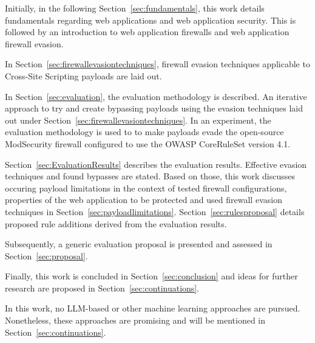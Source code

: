 Initially, in the following Section~\ref{sec:fundamentals}, this work details fundamentals regarding web applications and web application security. This is followed by an introduction to web application firewalls and web application firewall evasion.

In Section~\ref{sec:firewallevasiontechniques}, firewall evasion techniques applicable to Cross-Site Scripting payloads are laid out.

In Section~\ref{sec:evaluation}, the evaluation methodology is described. An iterative approach to try and create bypassing payloads using the evasion techniques laid out under Section~\ref{sec:firewallevasiontechniques}. In an experiment, the evaluation methodology is used to to make payloads evade the open-source ModSecurity firewall configured to use the OWASP CoreRuleSet version 4.1.

Section~\ref{sec:EvaluationResults} describes the evaluation results. Effective evasion techniques and found bypasses are stated. Based on those, this work discusses occuring payload limitations in the context of tested firewall configurations, properties of the web application to be protected and used firewall evasion techniques in Section~\ref{sec:payloadlimitations}. Section~\ref{sec:rulesproposal} details proposed rule additions derived from the evaluation results.

Subsequently, a generic evaluation proposal is presented and assessed in Section~\ref{sec:proposal}.

Finally, this work is concluded in Section~\ref{sec:conclusion} and ideas for further research are proposed in Section~\ref{sec:continuations}.

In this work, no LLM-based or other machine learning approaches are pursued. Nonetheless, these approaches are promising and will be mentioned in Section~\ref{sec:continuations}.
